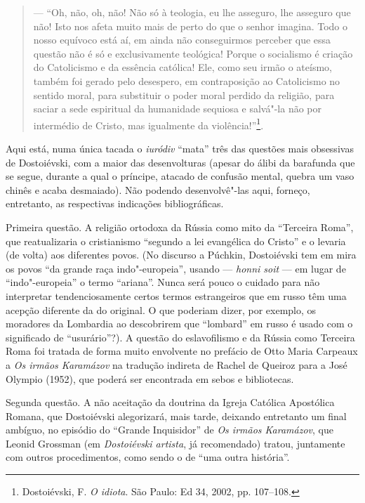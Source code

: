 \begin{quote}
--- ``Oh, não, oh, não! Não só à teologia, eu lhe asseguro, lhe
asseguro que não! Isto nos afeta muito mais de perto do que o senhor
imagina. Todo o nosso equívoco está aí, em ainda não conseguirmos
perceber que essa questão não é só e exclusivamente teológica! Porque o
socialismo é criação do Catolicismo e da essência católica! Ele, como
seu irmão o ateísmo, também foi gerado pelo desespero, em contraposição
ao Catolicismo no sentido moral, para substituir o poder moral perdido
da religião, para saciar a sede espiritual da humanidade sequiosa e
salvá"-la não por intermédio de Cristo, mas igualmente da violência!''\footnote{Dostoiévski, F. \emph{O idiota}. São Paulo: Ed 34, 2002, pp. 107--108.}.
\end{quote}

Aqui está, numa única tacada o \emph{iuródiv} ``mata'' três das questões
mais obsessivas de Dostoiévski, com a maior das desenvolturas (apesar
do álibi da barafunda que se segue, durante a qual o príncipe, atacado
de confusão mental, quebra um vaso chinês e acaba desmaiado). Não
podendo desenvolvê"-las aqui, forneço, entretanto, as respectivas indicações
bibliográficas.

Primeira questão. A religião ortodoxa da Rússia como mito da ``Terceira Roma'', que
reatualizaria o cristianismo ``segundo a lei evangélica do Cristo'' e o
levaria (de volta) aos diferentes povos. (No discurso a Púchkin,
Dostoiévski tem em mira os povos ``da grande raça indo"-europeia'',
usando --- \emph{honni soit} --- em lugar de ``indo"-europeia'' o termo ``ariana''. Nunca será pouco o cuidado para não interpretar
tendenciosamente certos termos estrangeiros que em russo têm uma acepção
diferente da do original. O que poderiam dizer, por exemplo, os
moradores da Lombardia ao descobrirem que ``lombard'' em russo é usado
com o significado de ``usurário''?). A questão do eslavofilismo e da
Rússia como Terceira Roma foi tratada de forma muito envolvente no
prefácio de Otto Maria Carpeaux a \emph{Os irmãos Karamázov} na
tradução indireta de Rachel de Queiroz para a José Olympio (1952), que
poderá ser encontrada em sebos e bibliotecas.

Segunda questão. A não aceitação da doutrina da Igreja Católica Apostólica Romana, que
Dostoiévski alegorizará, mais tarde, deixando entretanto um final
ambíguo, no episódio do ``Grande Inquisidor'' de \emph{Os irmãos
Karamázov}, que Leonid Grossman (em \emph{Dostoiévski artista}, já recomendado) tratou, juntamente com outros
procedimentos, como sendo o de ``uma outra história''.

